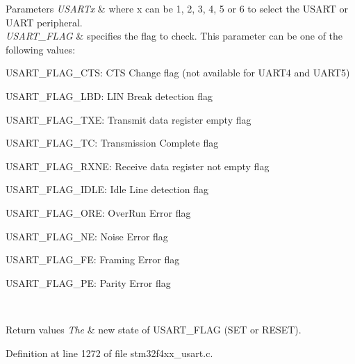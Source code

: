 \begin{DoxyParams}{Parameters}
{\em U\+S\+A\+R\+Tx} & where x can be 1, 2, 3, 4, 5 or 6 to select the U\+S\+A\+RT or U\+A\+RT peripheral. \\
\hline
{\em U\+S\+A\+R\+T\+\_\+\+F\+L\+AG} & specifies the flag to check. This parameter can be one of the following values\+: \begin{DoxyItemize}
\item U\+S\+A\+R\+T\+\_\+\+F\+L\+A\+G\+\_\+\+C\+TS\+: C\+TS Change flag (not available for U\+A\+R\+T4 and U\+A\+R\+T5) \item U\+S\+A\+R\+T\+\_\+\+F\+L\+A\+G\+\_\+\+L\+BD\+: L\+IN Break detection flag \item U\+S\+A\+R\+T\+\_\+\+F\+L\+A\+G\+\_\+\+T\+XE\+: Transmit data register empty flag \item U\+S\+A\+R\+T\+\_\+\+F\+L\+A\+G\+\_\+\+TC\+: Transmission Complete flag \item U\+S\+A\+R\+T\+\_\+\+F\+L\+A\+G\+\_\+\+R\+X\+NE\+: Receive data register not empty flag \item U\+S\+A\+R\+T\+\_\+\+F\+L\+A\+G\+\_\+\+I\+D\+LE\+: Idle Line detection flag \item U\+S\+A\+R\+T\+\_\+\+F\+L\+A\+G\+\_\+\+O\+RE\+: Over\+Run Error flag \item U\+S\+A\+R\+T\+\_\+\+F\+L\+A\+G\+\_\+\+NE\+: Noise Error flag \item U\+S\+A\+R\+T\+\_\+\+F\+L\+A\+G\+\_\+\+FE\+: Framing Error flag \item U\+S\+A\+R\+T\+\_\+\+F\+L\+A\+G\+\_\+\+PE\+: Parity Error flag \end{DoxyItemize}
\\
\hline
\end{DoxyParams}

\begin{DoxyRetVals}{Return values}
{\em The} & new state of U\+S\+A\+R\+T\+\_\+\+F\+L\+AG (S\+ET or R\+E\+S\+ET). \\
\hline
\end{DoxyRetVals}


Definition at line 1272 of file stm32f4xx\+\_\+usart.\+c.

\mbox{\label{group___u_s_a_r_t___group9_ga93d8f031241bcdbe938d091a85295445}} 
